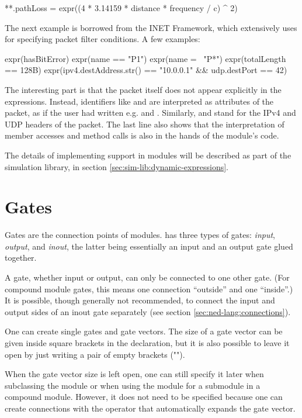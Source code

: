 \begin{inifile}
**.pathLoss = expr((4 * 3.14159 * distance * frequency / c) ^ 2)
\end{inifile}

The next example is borrowed from the INET Framework, which extensively uses
 for specifying packet filter conditions. A few examples:

\begin{ned}
expr(hasBitError)
expr(name == "P1")
expr(name =~ "P*")
expr(totalLength == 128B)
expr(ipv4.destAddress.str() == "10.0.0.1" && udp.destPort == 42)
\end{ned}

The interesting part is that the packet itself does not appear explicitly in the
expressions. Instead, identifiers like  and  are
interpreted as attributes of the packet, as if the user had written e.g.
 and . Similarly,  and 
stand for the IPv4 and UDP headers of the packet. The last line also shows that
the interpretation of member accesses and method calls is also in the hands of
the module's code.

The details of implementing  support in modules will be
described as part of the simulation library, in section
\ref{sec:sim-lib:dynamic-expressions}.


\section{Gates}
\label{sec:ned-lang:gates}

Gates are the connection points of modules. {\opp} has three types of
gates: \textit{input}, \textit{output}, and \textit{inout}, the latter being
essentially an input and an output gate glued together.

A gate, whether input or output, can only be connected to one other
gate. (For compound module gates, this means one connection ``outside'' and
one ``inside''.) It is possible, though generally not recommended, to
connect the input and output sides of an inout gate separately (see section
\ref{sec:ned-lang:connections}).

One can create single gates and gate vectors. The size of a gate vector
can be given inside square brackets in the declaration, but it is also possible
to leave it open by just writing a pair of empty brackets ("\ttt{[]}").

When the gate vector size is left open, one can still specify it later
when subclassing the module or when using the module for a submodule in a
compound module. However, it does not need to be specified because
one can create connections with the  operator that
automatically expands the gate vector.

